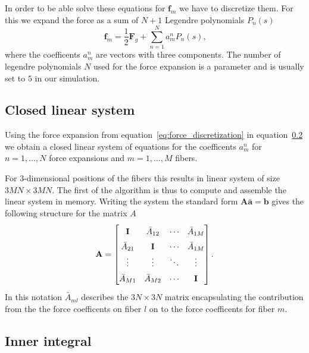\documentclass[a4paper,11pt]{kth-mag}
\begin{document}
In order to be able solve these equations for $\mathbf{f}_m$ we have to discretize them. For this we expand the force as a sum of $N+1$ Legendre polynomials $P_n(s)$
\begin{equation}
  \label{eq:force_discretization}
  \mathbf{f}_m = \frac{1}{2}\mathbf{F}_g + \sum_{n=1}^{N}a_{m}^{n} P_n(s) \text{,}
\end{equation}
where the coefficents $a_{m}^{n}$ are vectors with three components. The number of legendre polynomials $N$ used for the force expansion is a parameter and is usually set to $5$ in our simulation.

\subsection{Closed linear system}

Using the force expansion from equation~\ref{eq:force_discretization} in equation~\ref{} we obtain a closed linear system of equations for the coefficents $a_{m}^{n}$ for $n=1,\dots,N$ force expansions and $m = 1,\dots,M$ fibers.

For 3-dimensional positions of the fibers this results in linear system of size $3MN\times3MN$. The first of the algorithm is thus to compute and assemble the linear system in memory. Writing the system the standard form $\mathbf{A}\mathbf{\bar{a}}=\mathbf{b}$ gives the following structure for the matrix $A$
\begin{equation}
  \label{eq:matrix_structure}
  \renewcommand\arraystretch{1.5}
  \mathbf{A} =
  \begin{bmatrix}
    \mathbf{I} & \bar{A}_{12} & \cdots & \bar{A}_{1M} \\
    \bar{A}_{21} & \mathbf{I} & \cdots & \bar{A}_{1M} \\
    \vdots & \vdots & \ddots & \vdots \\
    \bar{A}_{M1} & \bar{A}_{M2} & \cdots & \mathbf{I}
  \end{bmatrix} \text{.}
\end{equation}
In this notation $\bar{A}_{ml}$ describes the $3N\times3N$ matrix encapsulating the contribution from the the force coefficents on fiber $l$ on to the force coefficents for fiber $m$.

\subsection{Inner integral}
\end{document}
